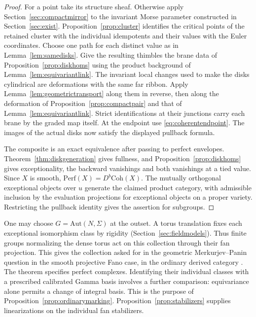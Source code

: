 \begin{proof}
For a point take its structure sheaf. Otherwise apply Section~\ref{sec:compactmirror} to the invariant Morse parameter constructed in Section~\ref{sec:exist}. Proposition~\ref{prop:cluster} identifies the critical points of the retained cluster with the individual idempotents and their values with the Euler coordinates. Choose one path for each distinct value as in Lemma~\ref{lem:samedisks}. Give the resulting thimbles the brane data of Proposition~\ref{prop:diskhoms} using the product background of Lemma~\ref{lem:equivariantlink}. The invariant local changes used to make the disks cylindrical are deformations with the same far ribbon. Apply Lemma~\ref{lem:geometrictransport} along them in reverse, then along the deformation of Proposition~\ref{prop:compactpair} and that of Lemma~\ref{lem:equivariantlink}. Strict identifications at their junctions carry each brane by the graded map itself. At the endpoint use \eqref{eq:coherentendpoint}. The images of the actual disks now satisfy the displayed pullback formula.

The composite is an exact equivalence after passing to perfect envelopes. Theorem~\ref{thm:diskgeneration} gives fullness, and Proposition~\ref{prop:diskhoms} gives exceptionality, the backward vanishings and both vanishings at a tied value. Since $X$ is smooth, $\mathrm{Perf}(X)=D^b\mathrm{Coh}(X)$. The mutually orthogonal exceptional objects over $u$ generate the claimed product category, with admissible inclusion by the evaluation projections for exceptional objects on a proper variety. Restricting the pullback identity gives the assertion for subgroups.
\end{proof}

One may choose $G=\mathrm{Aut}(N,\Sigma)$ at the outset. A torus translation fixes each exceptional isomorphism class by rigidity (Section~\ref{sec:fieldmodels}). Thus finite groups normalizing the dense torus act on this collection through their fan projection. This gives the collection asked for in the geometric Merkurjev--Panin question in the smooth projective Fano case, in the ordinary derived category \cite[Introduction]{EHLZ}. The theorem specifies perfect complexes. Identifying their individual classes with a prescribed calibrated Gamma basis involves a further comparison: equivariance alone permits a change of integral basis. This is the purpose of Proposition~\ref{prop:ordinarymarking}. Proposition~\ref{prop:stabilizers} supplies linearizations on the individual fan stabilizers.
